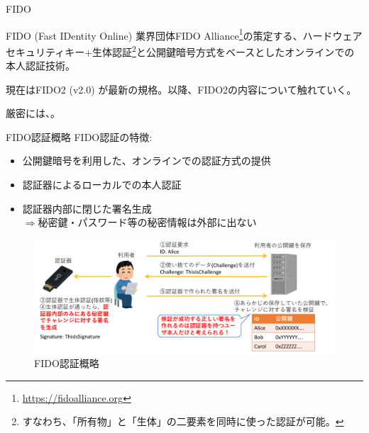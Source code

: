 \documentclass[12pt,dvipdfmx,uplatex]{beamer}
\begin{document}
\begin{frame}{FIDO}

\begin{block}{\small FIDO (Fast IDentity Online)}
業界団体FIDO Alliance\footnote[frame]{\scriptsize \url{https://fidoalliance.org}}の策定する、\alert{ハードウェアセキュリティキー+生体認証\footnote[frame]{\scriptsize すなわち、「所有物」と「生体」の二要素を同時に使った認証が可能。}と公開鍵暗号方式をベースとしたオンラインでの本人認証技術}。
\end{block}

現在はFIDO2 (v2.0) が最新の規格。以降、FIDO2の内容について触れていく。

\vspace{2ex}

厳密には、。

\end{frame}

\begin{frame}{FIDO認証概略}
FIDO認証の特徴:
\begin{itemize}
 \item 公開鍵暗号を利用した、オンラインでの認証方式の提供
 \item 認証器によるローカルでの本人認証
 \item 認証器内部に閉じた署名生成\\ $\Rightarrow$\alert{秘密鍵・パスワード等の秘密情報は外部に出ない}
\end{itemize}
\begin{figure}
\begin{center}
\includegraphics[width=0.9\linewidth]{Figs/FIDO2-auth.pdf}
\caption{FIDO認証概略}
\end{center}
\end{figure}
\end{frame}
\end{document}

